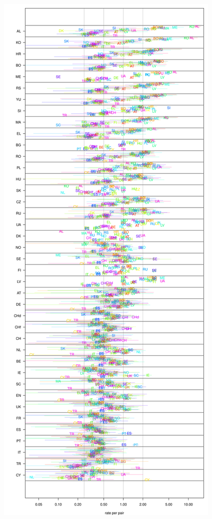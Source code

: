 \documentclass{article}
\begin{document}
\begin{figure}[!htp]
\begin{center}
    \vspace{2em}
    \begin{center}
      \includegraphics[height=.9\textheight]{sharing-rates-dotchart-long}
    \end{center}

\end{center}
\end{figure}
\end{document}
